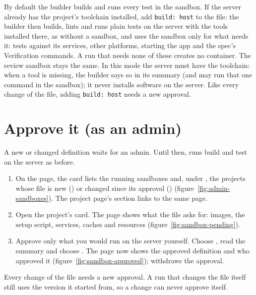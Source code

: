 By default the builder builds and runs every test in the sandbox. If the server already has the
project's toolchain installed, add \texttt{build: host} to the file: the builder then builds, lints
and runs plain tests on the server with the tools installed there, as without a sandbox, and uses
the sandbox only for what needs it: tests against its services, other platforms, starting the app
and the spec's Verification commands. A run that needs none of these creates no container. The
review sandbox stays the same. In this mode the server must have the toolchain: when a tool is
missing, the builder says so in its summary (and may run that one command in the sandbox); it never
installs software on the server. Like every change of the file, adding \texttt{build: host} needs a
new approval.

\section{Approve it (as an admin)}\label{sec:sandbox-approve}

A new or changed definition waits for an admin. Until then, runs build and test on the server as
before.

\begin{enumerate}
  \item On the  page, the  card lists the running sandboxes and, under
    , the projects whose file is new () or changed
    since its approval () (figure~\ref{fig:admin-sandboxes}). The project page's
     section links to the same page.
  \item Open the project's card. The  page shows what the file asks for: images, the
    setup script, services, caches and resources (figure~\ref{fig:sandbox-pending}).
  \item Approve only what you would run on the server yourself. Choose , read the
    summary and choose . The page now shows the approved definition and
    who approved it (figure~\ref{fig:sandbox-approved});  withdraws the approval.
\end{enumerate}

Every change of the file needs a new approval. A run that changes the file itself still uses the
version it started from, so a change can never approve itself.


